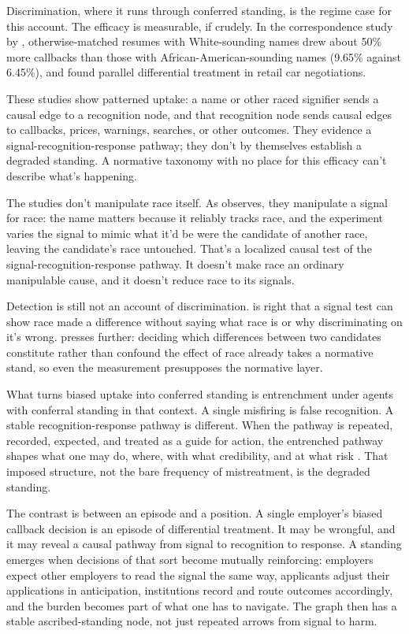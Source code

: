 \documentclass[12pt]{article}
\begin{document}
Discrimination, where it runs through conferred standing, is the regime case for this account. The efficacy is measurable, if crudely. In the correspondence study by \textcite[997--998]{bertrandMullainathan2004EmilyGreg}, otherwise-matched resumes with White-sounding names drew about 50\% more callbacks than those with African-American-sounding names (9.65\% against 6.45\%), and \textcite{ayres1991FairDriving} found parallel differential treatment in retail car negotiations.

These studies show patterned uptake: a name or other raced signifier sends a causal edge to a recognition node, and that recognition node sends causal edges to callbacks, prices, warnings, searches, or other outcomes. They evidence a signal-recognition-response pathway; they don't by themselves establish a degraded standing. A normative taxonomy with no place for this efficacy can't describe what's happening.

The studies don't manipulate race itself. As \textcite{weinbergerSignalManipulation} observes, they manipulate a signal for race: the name matters because it reliably tracks race, and the experiment varies the signal to mimic what it'd be were the candidate of another race, leaving the candidate's race untouched. That's a localized causal test of the signal-recognition-response pathway. It doesn't make race an ordinary manipulable cause, and it doesn't reduce race to its signals.

Detection is still not an account of discrimination. \textcite{kohlerHausmann2019EddieMurphy} is right that a signal test can show race made a difference without saying what race is or why discriminating on it's wrong. \textcite{huForthcomingNormativeFactsCausalStructure} presses further: deciding which differences between two candidates constitute rather than confound the effect of race already takes a normative stand, so even the measurement presupposes the normative layer.

What turns biased uptake into conferred standing is entrenchment under agents with conferral standing in that context. A single misfiring is false recognition. A stable recognition-response pathway is different. When the pathway is repeated, recorded, expected, and treated as a guide for action, the entrenched pathway shapes what one may do, where, with what credibility, and at what risk \citep{asta2018Categories}. That imposed structure, not the bare frequency of mistreatment, is the degraded standing.

The contrast is between an episode and a position. A single employer's biased callback decision is an episode of differential treatment. It may be wrongful, and it may reveal a causal pathway from signal to recognition to response. A standing emerges when decisions of that sort become mutually reinforcing: employers expect other employers to read the signal the same way, applicants adjust their applications in anticipation, institutions record and route outcomes accordingly, and the burden becomes part of what one has to navigate. The graph then has a stable ascribed-standing node, not just repeated arrows from signal to harm.
\end{document}
